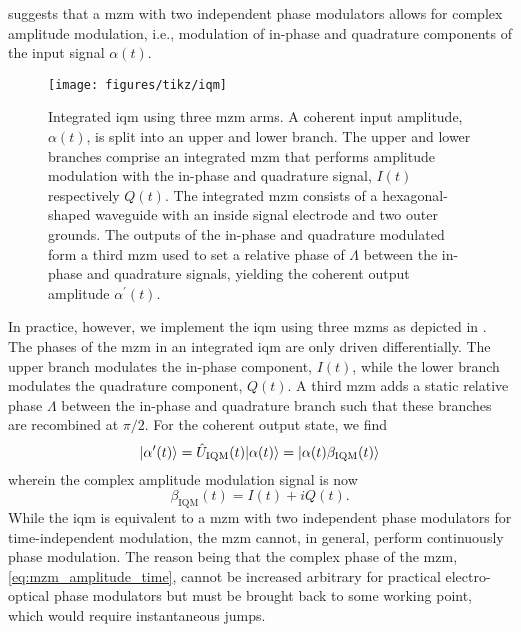  suggests that a \gls{mzm} with two independent phase modulators allows for complex amplitude modulation, i.e.,  modulation of in-phase and quadrature components of the input signal $\alpha(t)$.
\begin{figure}[htb]
    \centering
    \texttt{[image: figures/tikz/iqm]}
    \caption{Integrated \gls{iqm} using three \gls{mzm} arms. A coherent input amplitude, $\alpha(t)$, is split into an upper and lower branch. The upper and lower branches comprise an integrated \gls{mzm} that performs amplitude modulation with the in-phase and quadrature signal, $I(t)$ respectively $Q(t)$. The integrated \gls{mzm} consists of a hexagonal-shaped waveguide with an inside signal electrode and two outer grounds. The outputs of the in-phase and quadrature modulated form a third \gls{mzm} used to set a relative phase of $\Lambda$ between the in-phase and quadrature signals, yielding the coherent output amplitude $\alpha^\prime(t)$.}\label{fig:iqm}
\end{figure}
In practice, however, we implement the \gls{iqm} using three \gls{mzm}s as depicted in .
The phases of the \gls{mzm} in an integrated \gls{iqm} are only driven differentially.
The upper branch modulates the in-phase component, $I(t)$, while the lower branch modulates the quadrature component, $Q(t)$.
A third \gls{mzm} adds a static relative phase $\Lambda$ between the in-phase and quadrature branch such that these branches are recombined at $\pi/2$.
For the coherent output state, we find
\begin{equation}
	\ket*{\alpha^\prime(t)}
	=
	\hat{U}_\text{IQM}(t)
	\ket*{\alpha(t)}
	=
	\ket*{\alpha(t)\beta_\text{IQM}(t)}
\end{equation}
wherein the complex amplitude modulation signal is now
\begin{equation}
	\beta_\text{IQM}(t)
	=
	I(t)
	+
	iQ(t)
	\label{eq:iqm_modulation}
	.
\end{equation}
While the \gls{iqm} is equivalent to a \gls{mzm} with two independent phase modulators for time-independent modulation, the \gls{mzm} cannot, in general, perform continuously phase modulation.
The reason being that the complex phase of the \gls{mzm}, \cref{eq:mzm_amplitude_time}, cannot be increased arbitrary for practical electro-optical phase modulators but must be brought back to some working point, which would require instantaneous jumps.
